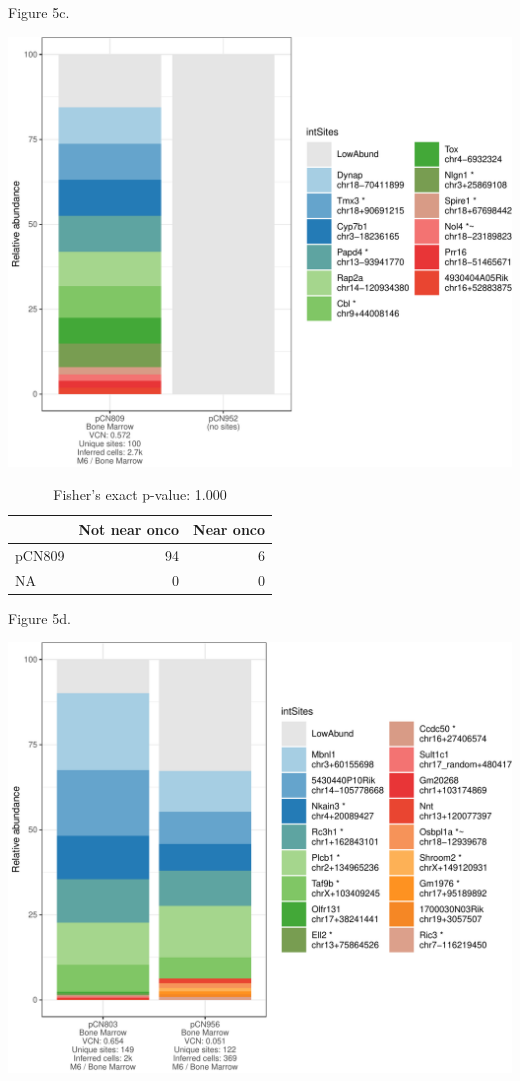 \documentclass[12pt,]{article}
\begin{document}
\newpage

Figure 5c.

\includegraphics{project.group2_files/figure-latex/unnamed-chunk-5-3.pdf}
\vspace{1.0cm}

\begin{table}[!h]

\caption{\label{tab:unnamed-chunk-5}Fisher's exact p-value: 1.000}
\centering
\begin{tabular}[t]{lrr}
\toprule
  & Not near onco & Near onco\\
\midrule
pCN809 & 94 & 6\\
NA & 0 & 0\\
\bottomrule
\end{tabular}
\end{table}

\newpage

Figure 5d.

\includegraphics{project.group2_files/figure-latex/unnamed-chunk-5-4.pdf}
\vspace{1.0cm}
\end{document}
